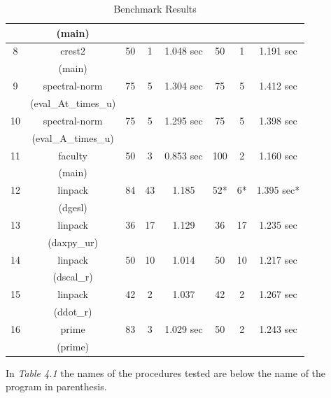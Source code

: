 \documentclass[12pt,oneside]{book}
\begin{document}
\begin{table}[hbtp]
{\begin{tabular}{|c|c|c|c|c|c|c|c|}
  &	(main) & & & & & & \\ [1ex]\hline
8                        & crest2             & 50                & 1                            & 1.048 sec  & 50		& 1		& 1.191 sec   \\[1ex] 
  &	(main) & & & & & & \\ [1ex]\hline
9                        & spectral-norm                          & 75                & 5              			& 1.304 sec  & 75			& 5			& 1.412 sec   \\[1ex] 
  &	(eval\_At\_times\_u) & & & & & & \\ [1ex]\hline
10                        & spectral-norm                          & 75                & 5              			& 1.295 sec  & 75			& 5			& 1.398 sec   \\[1ex] 
  &	(eval\_A\_times\_u) & & & & & & \\ [1ex]\hline
11			& faculty		& 50		& 3			& 0.853 sec 	& 100			& 2				& 1.160 sec
\\[1ex] 
  &	(main) & & & & & & \\ [1ex]\hline
12		   & linpack		& 84		& 43		& 1.185			&52*			& 6*			& 1.395 sec*
\\[1ex]
  &	(dgesl) & & & & & & \\ [1ex]\hline
13		   & linpack		& 36		& 17		& 1.129			&36			& 17			& 1.235 sec
\\[1ex]
  &	(daxpy\_ur) & & & & & & \\ [1ex]\hline
14		   & linpack		& 50		& 10		& 1.014			&50			& 10			& 1.217 sec
\\[1ex]
  &	(dscal\_r) & & & & & & \\ [1ex]\hline
15		   & linpack		& 42		& 2		& 1.037			&42			& 2			& 1.267 sec
\\[1ex]
  &	(ddot\_r) & & & & & & \\ [1ex]\hline
16                        & prime                    & 83                & 3                            & 1.029 sec   & 50		& 2			& 1.243 sec  \\[1ex] 
  &	(prime) & & & & & & \\ [1ex]\hline


\end{tabular}}
\caption{Benchmark Results}
\end{table}

In \textit{Table 4.1} the names of the procedures tested are below the name of the program in parenthesis.
\end{document}
